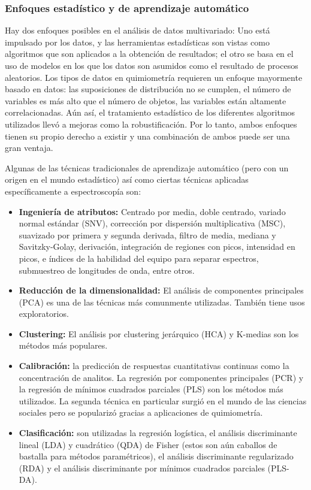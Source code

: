 \documentclass[12pt]{article}
\begin{document}
\subsubsection{Enfoques estadístico y de aprendizaje automático}

Hay dos enfoques posibles en el análisis de datos multivariado: Uno está impulsado por los datos, y las herramientas estadísticas son vistas como algoritmos que son aplicados a la obtención de resultados; el otro se basa en el uso de modelos en los que los datos son asumidos como el resultado de procesos aleatorios. Los tipos de datos en quimiometría requieren un enfoque mayormente basado en datos: las suposiciones de distribución no se cumplen, el número de variables es más alto que el número de objetos, las variables están altamente correlacionadas\cite{Chemo}. Aún así, el tratamiento estadístico de los diferentes algoritmos utilizados llevó a mejoras como la robustificación. Por lo tanto, ambos enfoques tienen su propio derecho a existir y una combinación de ambos puede ser una gran ventaja.

Algunas de las técnicas tradicionales de aprendizaje automático (pero con un origen en el mundo estadístico) así como ciertas técnicas aplicadas específicamente a espectroscopía son\cite{STATS}\cite{F-ENG}:

\begin{itemize}
    \item \textbf{Ingeniería de atributos:} Centrado por media, doble centrado, variado normal estándar (SNV), corrección por dispersión multiplicativa (MSC), suavizado por primera y segunda derivada, filtro de media, mediana y Savitzky-Golay, derivación, integración de regiones con picos, intensidad en picos, e índices de la habilidad del equipo para separar espectros, submuestreo de longitudes de onda, entre otros. 
    \item \textbf{Reducción de la dimensionalidad:} El análisis de componentes principales (PCA) es una de las técnicas más comunmente utilizadas. También tiene usos exploratorios.
    \item \textbf{Clustering:}  El análisis por clustering jerárquico (HCA) y K-medias son los métodos más populares.
    \item \textbf{Calibración:} la predicción de respuestas cuantitativas continuas como la concentración de analitos. La regresión por componentes principales (PCR) y la regresión de mínimos cuadrados parciales (PLS) son los métodos más utilizados. La segunda técnica en particular surgió en el mundo de las ciencias sociales pero se popularizó gracias a aplicaciones de quimiometría.
    \item \textbf{Clasificación:} son utilizadas la regresión logística, el análisis discriminante lineal (LDA) y cuadrático (QDA) de Fisher (estos son aún caballos de bastalla para métodos paramétricos), el análisis discriminante regularizado (RDA) y el análisis discriminante por mínimos cuadrados parciales (PLS-DA).
\end{itemize}
\end{document}
